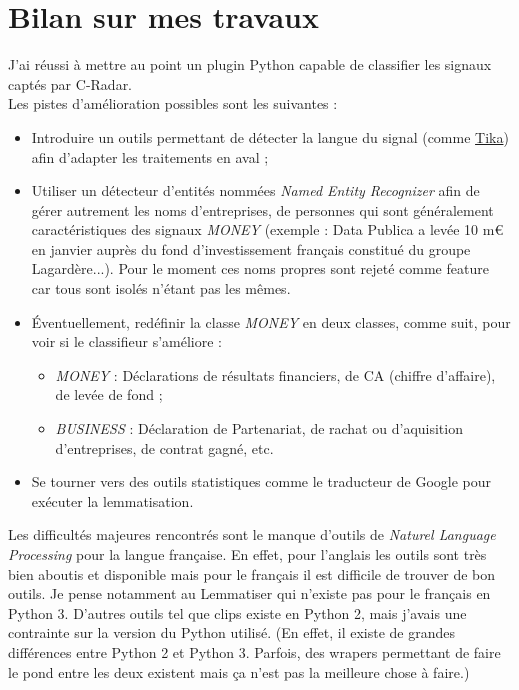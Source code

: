 \section{Bilan sur mes travaux}
    J'ai réussi à mettre au point un plugin Python capable de classifier les signaux captés par C-Radar.\\

    Les pistes d'amélioration possibles sont les suivantes :
    \begin{itemize}
        \item Introduire un outils permettant de détecter la langue du signal (comme \href{https://tika.apache.org/}{Tika}) afin d'adapter les traitements en aval ;
        \item Utiliser un détecteur d'entités nommées \textit{Named Entity Recognizer} afin de gérer autrement les noms d'entreprises, de personnes qui sont généralement caractéristiques des signaux \textit{MONEY} (exemple : \og Data Publica a levée 10 m€ en janvier auprès du fond d'investissement français constitué du groupe Lagardère...\fg). Pour le moment ces noms propres sont rejeté comme feature car tous sont isolés n'étant pas les mêmes.
        \item Éventuellement, redéfinir la classe \textit{MONEY} en deux classes, comme suit, pour voir si le classifieur s'améliore :
        \begin{itemize}
            \item \textit{MONEY} : Déclarations de résultats financiers, de CA (chiffre d'affaire), de levée de fond ;
            \item \textit{BUSINESS} : Déclaration de Partenariat, de rachat ou d'aquisition d'entreprises, de \og contrat gagné\fg, etc.
        \end{itemize}
        \item Se tourner vers des outils statistiques comme le traducteur de Google pour exécuter la lemmatisation.\\
    \end{itemize}

    Les difficultés majeures rencontrés sont le manque d'outils de \textit{Naturel Language Processing} pour la langue française. En effet, pour l'anglais les outils sont très bien aboutis et disponible mais pour le français il est difficile de trouver de bon outils. Je pense notamment au Lemmatiser qui n'existe pas pour le français en Python 3. D'autres outils tel que clips existe en Python 2, mais j'avais une contrainte sur la version du Python utilisé. (En effet, il existe de grandes différences entre Python 2 et Python 3. Parfois, des wrapers permettant de faire le pond entre les deux existent mais ça n'est pas la meilleure chose à faire.)